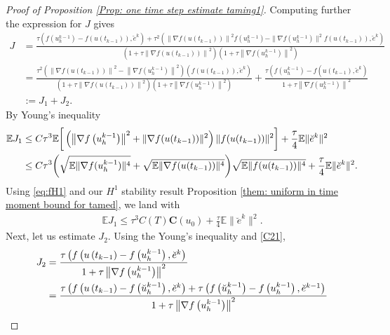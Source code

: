 \documentclass[reqno, 11pt]{amsart}
\theoremstyle{plain}
\theoremstyle{definition}
\theoremstyle{remark}
\numberwithin{equation}{section}
\numberwithin{theorem}{section}
\newcommand{\con}{\mathbf{C}}
\begin{document}
{\begin{proof}[Proof of Proposition \ref{Prop: one time  step estimate taming1}]
Computing further the expression for $J$ gives
$$
\begin{aligned}
J & =\frac{\tau\left(f\left(u_h^{k-1}\right)-f\left(u\left(t_{k-1}\right)\right), \breve{e}^k\right)+\tau^2\left(\left\|\nabla f\left(u\left(t_{k-1}\right)\right)\right\|^2 f\left(u_h^{k-1}\right)-\| \nabla f\left(u_h^{k-1}\right) \|^2 f\left(u\left(t_{k-1}\right)\right), \breve{e}^k\right)}{\left(1+\tau\left\|\nabla f\left(u\left(t_{k-1}\right)\right)\right\|^2\right)\left(1+\tau\left\|\nabla f\left(u_h^{k-1}\right)\right\|^2\right)} \\
& =\frac{\tau^2\left(\left\|\nabla f\left(u\left(t_{k-1}\right)\right)\right\|^2-\left\|\nabla f\left(u_h^{k-1}\right)\right\|^2\right)\left(f\left(u\left(t_{k-1}\right)\right), \breve{e}^k\right)}{\left(1+\tau\left\|\nabla f\left(u\left(t_{k-1}\right)\right)\right\|^2\right)\left(1+\tau\left\|\nabla f\left(u_h^{k-1}\right)\right\|^2\right)}+\frac{\tau\left(f\left(u_h^{k-1}\right)-f\left(u\left(t_{k-1}\right), \breve{e}^k\right)\right.}{1+\tau\left\|\nabla f\left(u_h^{k-1}\right)\right\|^2}\\
&:=J_1+J_2.
\end{aligned}
$$
By Young's inequality
\begin{align}
\mathbb{E} J_1 & \leq C \tau^3 \mathbb{E}
\bigg[\left(\left\|\nabla f\left(u_h^{k-1}\right)\right\|^2
+\|\nabla f(u(t_{k-1}))\|^2 \right)\|f(u(t_{k-1}))\|^2\bigg]+\frac{\tau}{4} \mathbb{E}\| \breve{e}^k\|^2 \notag \\
&\leq C\tau^3\bigg(\sqrt{\mathbb{E}\|\nabla f(u_h^{k-1})\|^4}+\sqrt{\mathbb{E}\|\nabla f(u(t_{k-1}))\|^4} \bigg)\sqrt{\mathbb{E}\|f(u(t_{k-1}))\|^4}
+\frac{\tau}{4} \mathbb{E}\|\breve{e}^k\|^2.
\end{align}
Using \eqref{eq:fH1}  and  our $H^1$ stability result Proposition \ref{them: uniform in time moment bound for tamed}, we land with 
\begin{align}
\mathbb{E}J_1\leq \tau^3 C(T)\con(u_0)+\frac{\tau}{4} \mathbb{E}\|\breve{e}^k\|^2.
\end{align}
Next, let us estimate $J_2$. Using the Young's inequality and \eqref{C21}, 
\begin{align}
J_2 & =\frac{\tau\left(
f\left(u\left(t_{k-1}\right)-f\left(u_h^{k-1}\right), \breve{e}^k\right)\right.}{1+\tau\left\|\nabla f\left(u_h^{k-1}\right)\right\|^2} \\
& =\frac{\tau\left(f\left(u\left(t_{k-1}\right)-f\left(\breve{u}_h^{k-1}\right), \breve{e}^k\right)+\tau\left( f\left(\breve{u}_h^{k-1}\right)-f\left(u_h^{k-1}\right), \breve{e}^{k-1}\right)\right.}{1+\tau\left\|\nabla f\left(u_h^{k-1}\right)\right\|^2} \notag\\

\end{align}
\end{proof}}
\end{document}
